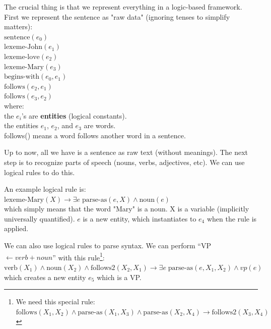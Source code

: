 The crucial thing is that we represent everything in a logic-based framework. First we represent the sentence as "raw data" (ignoring tenses to simplify matters):\\
\hspace*{1cm} $\mbox{sentence}(e_0)$\\
\hspace*{1cm} $\mbox{lexeme-John}(e_1)$\\
\hspace*{1cm} $\mbox{lexeme-love}(e_2)$\\
\hspace*{1cm} $\mbox{lexeme-Mary}(e_3)$\\
\hspace*{1cm} $\mbox{begins-with}(e_0, e_1)$\\
\hspace*{1cm} $\mbox{follows}(e_2, e_1)$\\
\hspace*{1cm} $\mbox{follows}(e_3, e_2)$\\
where:\\
\hspace*{1cm} the $e_i$'s are \textbf{entities} (logical constants).\\
\hspace*{1cm} the entities $e_1$, $e_2$, and $e_3$ are words.\\
\hspace*{1cm} follows() means a word follows another word in a sentence.

Up to now, all we have is a sentence as raw text (without meanings).  The next step is to recognize parts of speech (nouns, verbs, adjectives, etc). We can use logical rules to do this.

An example logical rule is:\\
\hspace*{1cm} $\mbox{lexeme-Mary}(X) \rightarrow \exists e \; \mbox{parse-as}(e, X) \wedge \mbox{noun}(e)$\\
which simply means that the word "Mary" is a noun. X is a variable (implicitly universally quantified). $e$ is a new entity, which instantiates to $e_4$ when the rule is applied.

We can also use logical rules to parse syntax. We can perform ``VP $\leftarrow verb + noun$'' with this rule\footnote{We need this special rule:\\
\hspace*{1cm} $\mbox{follows}(X_1, X_2) \wedge \mbox{parse-as}(X_1, X_3) \wedge \mbox{parse-as}(X_2, X_4) \rightarrow \mbox{follows2}(X_3, X_4)$ }:\\
\hspace*{1cm} $\mbox{verb}(X_1) \wedge \mbox{noun}(X_2) \wedge \mbox{follows2}(X_2, X_1) \rightarrow \exists e \; \mbox{parse-as}(e, X_1, X_2) \wedge vp(e)$\\
which creates a new entity $e_5$ which is a VP.


